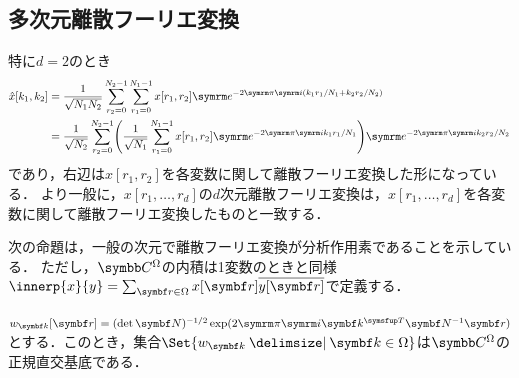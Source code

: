 \documentclass[../../main]{subfiles}
\begin{document}
\subsection{多次元離散フーリエ変換}


特に\(d=2\)のとき
\begin{align*}
  \hat{x}[k_1,k_2] &= \frac{1}{\sqrt{N_1N_2}}\sum_{r_2=0}^{N_2-1}\sum_{r_1=0}^{N_1-1}x[r_1,r_2]\napr^{-2\krez\iuni(k_1r_1/N_1+k_2r_2/N_2)} \\
  &= \frac{1}{\sqrt{N_2}}\sum_{r_2=0}^{N_2-1}\pqty*{\frac{1}{\sqrt{N_1}}\sum_{r_1=0}^{N_1-1}x[r_1,r_2]\napr^{-2\krez\iuni k_1r_1/N_1}}\napr^{-2\krez\iuni k_2r_2/N_2}
\end{align*}
であり，右辺は\(x[r_1,r_2]\)を各変数に関して離散フーリエ変換した形になっている．
より一般に，\(x[r_1,\dots,r_d]\)の\(d\)次元離散フーリエ変換は，\(x[r_1,\dots,r_d]\)を各変数に関して離散フーリエ変換したものと一致する．

次の命題は，一般の次元で離散フーリエ変換が分析作用素であることを示している．
ただし，\(\numset{C}^\Omega\)の内積は1変数のときと同様\(\innerp{x}{y}=\sum_{\vect{r}\in\Omega}x[\vect{r}]\conj*{y[\vect{r}]}\)で定義する．

\begin{proposition}{}{}
  \(w_{\vect{k}}[\vect{r}]=(\det\mat{N})^{-1/2}\exp(2\krez\iuni\trps{\vect{k}}\mat{N}^{-1}\vect{r})\)とする．このとき，集合\(\Set{w_{\vect{k}}\given\vect{k}\in\Omega}\)は\(\numset{C}^\Omega\)の正規直交基底である．
\end{proposition}
\end{document}
